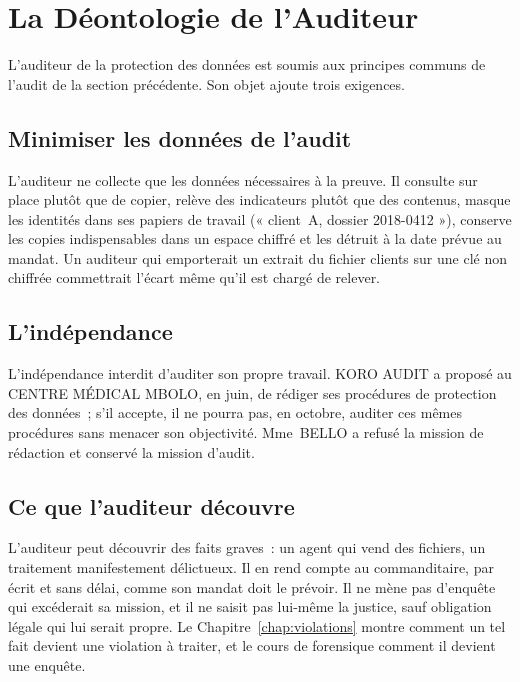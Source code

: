 \section{La Déontologie de l'Auditeur}
\label{sec:c08-deontologie}

L'auditeur de la protection des données est soumis aux principes communs de
l'audit de la section précédente. Son objet ajoute trois exigences.

\subsection{Minimiser les données de l'audit}

L'auditeur ne collecte que les données nécessaires à la preuve. Il consulte
sur place plutôt que de copier, relève des indicateurs plutôt que des
contenus, masque les identités dans ses papiers de travail (« client~A,
dossier 2018-0412 »), conserve les copies indispensables dans un espace
chiffré et les détruit à la date prévue au mandat. Un auditeur qui
emporterait un extrait du fichier clients sur une clé non chiffrée
commettrait l'écart même qu'il est chargé de relever.

\subsection{L'indépendance}

L'indépendance interdit d'auditer son propre travail. KORO AUDIT a proposé
au CENTRE MÉDICAL MBOLO, en juin, de rédiger ses procédures de protection
des données~; s'il accepte, il ne pourra pas, en octobre, auditer ces
mêmes procédures sans menacer son objectivité. Mme~BELLO a refusé la
mission de rédaction et conservé la mission d'audit.

\subsection{Ce que l'auditeur découvre}

L'auditeur peut découvrir des faits graves~: un agent qui vend des fichiers,
un traitement manifestement délictueux. Il en rend compte au commanditaire,
par écrit et sans délai, comme son mandat doit le prévoir. Il ne mène pas
d'enquête qui excéderait sa mission, et il ne saisit pas lui-même la
justice, sauf obligation légale qui lui serait propre. Le
Chapitre~\ref{chap:violations} montre comment un tel fait devient une
violation à traiter, et le cours de forensique comment il devient une
enquête.

